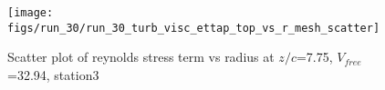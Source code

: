 \begin{figure}[H]
\centering
\texttt{[image: figs/run\_30/run\_30\_turb\_visc\_ettap\_top\_vs\_r\_mesh\_scatter]}
\caption{Scatter plot of reynolds stress term vs radius at $z/c$=7.75, $V_{free}$=32.94, station3}
\label{fig:run_30_turb_visc_ettap_top_vs_r_mesh_scatter}
\end{figure}


